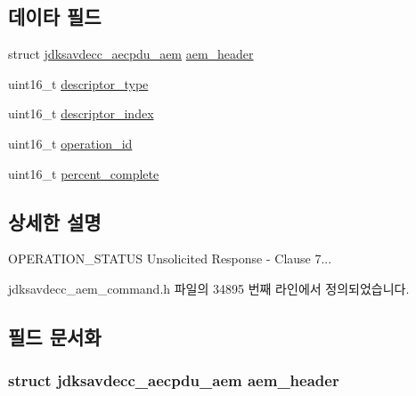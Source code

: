 \subsection*{데이타 필드}
\begin{DoxyCompactItemize}
\item 
struct \hyperlink{structjdksavdecc__aecpdu__aem}{jdksavdecc\+\_\+aecpdu\+\_\+aem} \hyperlink{structjdksavdecc__aem__command__operation__status__response_ae1e77ccb75ff5021ad923221eab38294}{aem\+\_\+header}
\item 
uint16\+\_\+t \hyperlink{structjdksavdecc__aem__command__operation__status__response_ab7c32b6c7131c13d4ea3b7ee2f09b78d}{descriptor\+\_\+type}
\item 
uint16\+\_\+t \hyperlink{structjdksavdecc__aem__command__operation__status__response_a042bbc76d835b82d27c1932431ee38d4}{descriptor\+\_\+index}
\item 
uint16\+\_\+t \hyperlink{structjdksavdecc__aem__command__operation__status__response_a5b1b19c38a3b340cfc6ebcb9eeb153e2}{operation\+\_\+id}
\item 
uint16\+\_\+t \hyperlink{structjdksavdecc__aem__command__operation__status__response_aecd19b49efe60de843635a9ab3ac6dd7}{percent\+\_\+complete}
\end{DoxyCompactItemize}


\subsection{상세한 설명}
O\+P\+E\+R\+A\+T\+I\+O\+N\+\_\+\+S\+T\+A\+T\+US Unsolicited Response -\/ Clause 7... 

jdksavdecc\+\_\+aem\+\_\+command.\+h 파일의 34895 번째 라인에서 정의되었습니다.



\subsection{필드 문서화}
\subsubsection[{\texorpdfstring{aem\+\_\+header}{aem_header}}]{\setlength{\rightskip}{0pt plus 5cm}struct {\bf jdksavdecc\+\_\+aecpdu\+\_\+aem} aem\+\_\+header}\hypertarget{structjdksavdecc__aem__command__operation__status__response_ae1e77ccb75ff5021ad923221eab38294}{}\label{structjdksavdecc__aem__command__operation__status__response_ae1e77ccb75ff5021ad923221eab38294}


